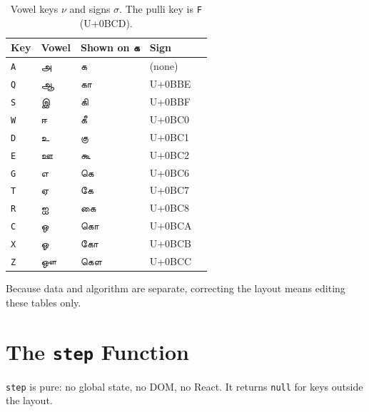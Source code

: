 \documentclass[11pt,a4paper]{article}
\newcommand{\tam}[1]{{\tamilfont #1}}
\begin{document}
\begin{table}[h]
\centering
\begin{tabular}{llllc}
\toprule
Key & Vowel & Shown on \tam{க} & Sign\\
\midrule
\texttt{A} & \tam{அ} & \tam{க} & (none)\\
\texttt{Q} & \tam{ஆ} & \tam{கா} & U+0BBE\\
\texttt{S} & \tam{இ} & \tam{கி} & U+0BBF\\
\texttt{W} & \tam{ஈ} & \tam{கீ} & U+0BC0\\
\texttt{D} & \tam{உ} & \tam{கு} & U+0BC1\\
\texttt{E} & \tam{ஊ} & \tam{கூ} & U+0BC2\\
\texttt{G} & \tam{எ} & \tam{கெ} & U+0BC6\\
\texttt{T} & \tam{ஏ} & \tam{கே} & U+0BC7\\
\texttt{R} & \tam{ஐ} & \tam{கை} & U+0BC8\\
\texttt{C} & \tam{ஒ} & \tam{கொ} & U+0BCA\\
\texttt{X} & \tam{ஓ} & \tam{கோ} & U+0BCB\\
\texttt{Z} & \tam{ஔ} & \tam{கௌ} & U+0BCC\\
\bottomrule
\end{tabular}
\caption{Vowel keys $\nu$ and signs $\sigma$. The pulli key is \texttt{F}
(U+0BCD).}
\end{table}

Because data and algorithm are separate, correcting the layout means editing
these tables only.

\section{The \texttt{step} Function}
\texttt{step} is pure: no global state, no DOM, no React. It returns
\texttt{null} for keys outside the layout.
\end{document}
